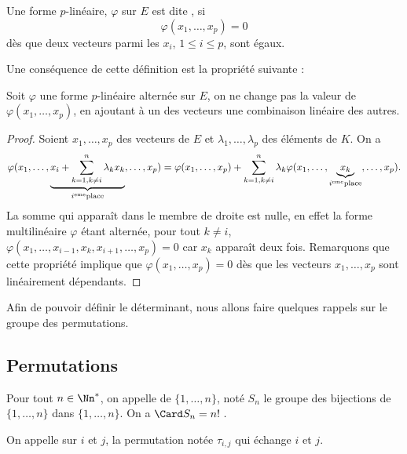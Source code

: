 \documentclass[class=report,crop=false]{standalone}
\begin{document}
\begin{definition}
Une forme $p$-linéaire, $\varphi$ sur $E$ est dite , si
$$\varphi(x_1,\dots,x_p)=0$$
dès que deux vecteurs parmi les $x_i$, $1\leq i\leq p$, sont égaux.  
\end{definition}

Une conséquence de cette définition est la propriété suivante :

\begin{proposition}
Soit $\varphi$ une forme $p$-linéaire alternée sur $E$,
on ne change pas la valeur de $\varphi(x_1,\dots,x_p)$, 
en ajoutant à un des vecteurs une combinaison
linéaire des autres.  
\end{proposition}


\begin{proof}
Soient $x_1,\dots,x_p$ des vecteurs de $E$ et $\lambda_1,\dots,\lambda_p$ des éléments de $K$.
On a
$$\varphi(x_1,\dots,\underbrace{x_i+\sum_{k=1,k\neq i}^n\lambda_kx_k}_{i^{\rm eme}{\rm place}},\dots,x_p)=
\varphi(x_1,\dots,x_p)+\sum_{k=1,k\neq i}^n\lambda_k\varphi(x_1,\dots,\underbrace{x_k}_{i^{\rm eme}{\rm place}},\dots,x_p).$$
La somme qui apparaît dans le membre de droite est nulle, en effet la forme multilinéaire $\varphi$ étant alternée, pour tout $k\neq i$, $\varphi(x_1,\dots,x_{i-1},x_k,x_{i+1},\dots,x_p)=0$
car $x_k$ apparaît deux fois. Remarquons que cette propriété implique que $\varphi(x_1,\dots,x_p)=0$ dès que les vecteurs 
$x_1,\dots,x_p$ sont linéairement dépendants.  
\end{proof}

Afin de pouvoir définir le déterminant, nous allons faire quelques 
rappels sur le groupe des permutations.



\subsection{Permutations}

\begin{definition}
Pour tout $n\in\Nn^*$, on appelle  de $\{1,\dots,n\}$, noté
$S_n$ le groupe des bijections de $\{1,\dots,n\}$ dans $\{1,\dots,n\}$. On a $\Card S_n=n!\ .$
\end{definition}


\begin{definition}
On appelle  sur $i$ et $j$, la permutation notée $\tau_{i,j}$ qui
échange $i$ et $j$.  
\end{definition}
\end{document}

